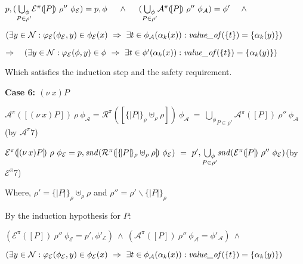 \documentclass[10pt,a4paper,final,oneside,fleqn]{book}
\begin{document}
\noindent
$p,(\underset{P\in\rho'}{\bigcup_\phi}\mathcal{E}^\pi(\![P]\!)~\rho''~\phi_{\mathcal{E}})=p,\phi~~~~\wedge~~~~(\underset{P\in\rho'}{\bigcup_\phi}\mathcal{A}^\pi(\![P]\!)~\rho''~\phi_{\mathcal{A}})=\phi'~~~~\wedge\vspace{3mm}$

\noindent
$(\exists y\in\mathcal{N}:\varphi_\mathcal{E}(\phi_\mathcal{E},y)\in\phi_\mathcal{E}(x)~\Rightarrow~\exists t\in\phi_\mathcal{A}(\alpha_k(x)):\mbox{{\itshape value\_of\/}}(\{t\})=\{\alpha_k(y)\})$\vspace{5mm}

\noindent
$\Rightarrow~~~(\exists y\in\mathcal{N}:\varphi_\mathcal{E}(\phi,y)\in\phi~\Rightarrow~\exists t\in\phi'(\alpha_k(x)):\mbox{{\itshape value\_of\/}}(\{t\})=\{\alpha_k(y)\})$\vspace{5mm}

\noindent
Which satisfies the induction step and the safety requirement.\vspace{5mm}

\noindent
{\bf Case 6: $(\nu~\!x)P$}

\noindent
$\mathcal{A}^\pi(\![(\nu~\!x)P]\!)~\rho~\phi_\mathcal{A}={\mathcal R}^\pi(\![\{\!|P|\!\}_\rho\uplus_\rho\rho]\!)~\phi_\mathcal{A}~=~\underset{P\in\rho'}{\bigcup_\phi}\mathcal{A}^\pi(\![P]\!)~\rho''~\phi_\mathcal{A}$\hfill(by $\mathcal{A}^{\pi}7$)\vspace{5mm}

\noindent
$\mathcal{E}^\pi(\![(\nu~\!x)P]\!)~\rho~\phi_\mathcal{E}=p,\mbox{{\itshape snd\/}}({\mathcal R}^\pi(\![\{\!|P|\!\}_\rho\uplus_\rho\rho]\!)~\phi_\mathcal{E})~=~p',\underset{P\in\rho'}{\bigcup_\phi}\mbox{{\itshape snd\/}}(\mathcal{E}^\pi(\![P]\!)~\rho''~\phi_\mathcal{E})$\hfill(by $\mathcal{E}^{\pi}7$)\vspace{5mm}

\noindent
Where, $\rho'=\{\!|P|\!\}_\rho\uplus_\rho\rho$ and $\rho''=\rho'\backslash\{\!|P|\!\}_\rho$\vspace{5mm}

\noindent
By the induction hypothesis for $P$:

\noindent
$(\mathcal{E}^\pi(\![P]\!)~\rho''~\phi_{\mathcal{E}}=p',\phi'_\mathcal{E})~\wedge~(\mathcal{A}^\pi(\![P]\!)~\rho''~\phi_{\mathcal{A}}=\phi'_\mathcal{A})~\wedge$

\noindent
$(\exists y\in\mathcal{N}:\varphi_\mathcal{E}(\phi_\mathcal{E},y)\in\phi_\mathcal{E}(x)~\Rightarrow~\exists t\in\phi_\mathcal{A}(\alpha_k(x)):\mbox{{\itshape value\_of\/}}(\{t\})=\{\alpha_k(y)\})$\vspace{5mm}
\end{document}
